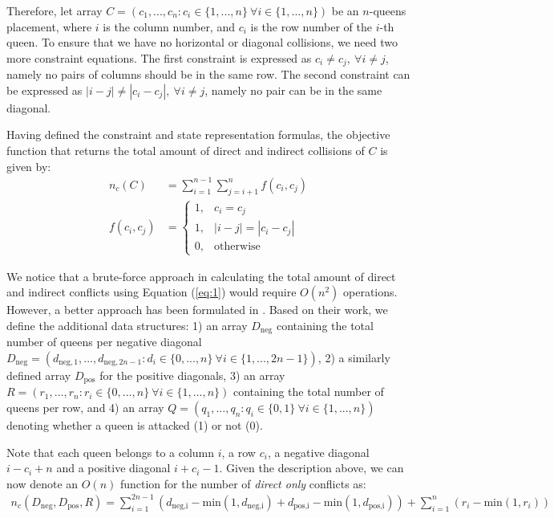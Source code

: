 Therefore, let array $C=(c_1,...,c_n : c_i \in \{1,...,n\} \ \forall i \in \{1,...,n\})$ be an $n$-queens placement, where $i$ is the column number, and $c_i$ is the row number of the $i$-th queen. To ensure that we have no horizontal or diagonal collisions, we need two more constraint equations. The first constraint is expressed as $c_i\ne c_j, \ \forall i \ne j$, namely no pairs of columns should be in the same row. The second constraint can be expressed as $|i-j| \ne |c_i - c_j|, \ \forall i \ne j$, namely no pair can be in the same diagonal.

Having defined the constraint and state representation formulas, the objective function that returns the total amount of direct and indirect collisions of $C$ is given by:
\smallskip
\begin{align}
\label{eq:1}
n_c(C) &= \sum_{i=1}^{n-1} \sum_{j=i+1}^n f(c_i,c_j) \\
\label{eq:2}
f(c_i, c_j) &=  
\begin{cases}
   1, & c_i = c_j \\
   1, & |i-j| = |c_i - c_j| \\
    0,              & \text{otherwise}
\end{cases}
\end{align}

We notice that a brute-force approach in calculating the total amount of direct and indirect conflicts using Equation (\ref{eq:1}) would require $O(n^2)$ operations. However, a better approach has been formulated in \citet{sosic91}. Based on their work, we define the additional data structures: 1) an array $D_{\text{neg}}$ containing the total number of queens per negative diagonal $D_{\text{neg}}=(d_{\text{neg},1},...,d_{\text{neg},2n-1} : d_{i} \in \{0,...,n\} \ \forall i \in \{1,...,2n-1\})$, 2) a similarly defined array $D_{\text{pos}}$ for the positive diagonals, 3) an array $R=(r_{1},...,r_{n} : r_{i} \in \{0,...,n\} \ \forall i \in \{1,...,n\})$ containing the total number of queens per row, and 4) an array $Q=(q_1,...,q_n : q_i \in \{0, 1\} \ \forall i \in \{1,...,n\})$ denoting whether a queen is attacked (1) or not (0).

Note that each queen belongs to a column $i$, a row $c_i$, a negative diagonal $i-c_{i}+n$ and a positive diagonal $i+c_{i}-1$. Given the description above, we can now denote an $O(n)$ function for the number of \emph{direct only} conflicts as:
\smallskip
\begin{align}
\label{eq:3}
n_c(D_{\text{neg}}, D_{\text{pos}}, R) = \sum_{i=1}^{2n-1}(d_{\text{neg,i}} - \text{min}(1, d_{\text{neg,i}}) + d_{\text{pos,i}} - \text{min}(1, d_{\text{pos,i}})) + \sum_{i=1}^{n}(r_i - \text{min}(1, r_i))
\end{align}

